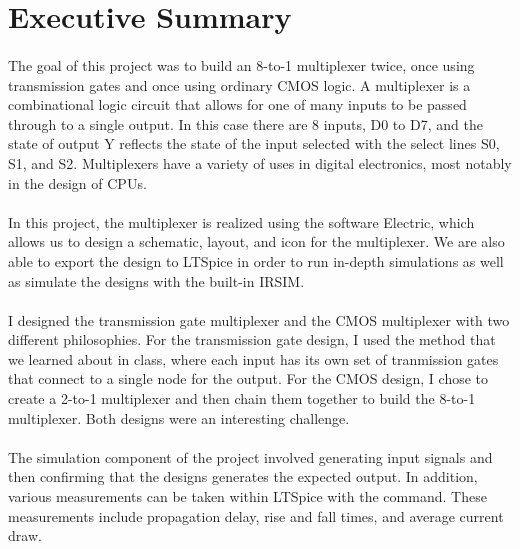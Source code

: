 \documentclass{article}
\begin{document}



\tableofcontents

\newpage
{}

\section{Executive Summary}
  \paragraph{}
  The goal of this project was to build an 8-to-1 multiplexer twice, once using transmission gates and once using ordinary CMOS logic. A multiplexer is a combinational logic circuit that allows for one of many inputs to be passed through to a single output. In this case there are 8 inputs, D0 to D7, and the state of output Y reflects the state of the input selected with the select lines S0, S1, and S2. Multiplexers have a variety of uses in digital electronics, most notably in the design of CPUs.

  \paragraph{}
  In this project, the multiplexer is realized using the software Electric, which allows us to design a schematic, layout, and icon for the multiplexer. We are also able to export the design to LTSpice in order to run in-depth simulations as well as simulate the designs with the built-in IRSIM. 

  \paragraph{}
  I designed the transmission gate multiplexer and the CMOS multiplexer with two different philosophies. For the transmission gate design, I used the method that we learned about in class, where each input has its own set of tranmission gates that connect to a single node for the output. For the CMOS design, I chose to create a 2-to-1 multiplexer and then chain them together to build the 8-to-1 multiplexer. Both designs were an interesting challenge.

  \paragraph{}
  The simulation component of the project involved generating input signals and then confirming that the designs generates the expected output. In addition, various measurements can be taken within LTSpice with the  command. These measurements include propagation delay, rise and fall times, and average current draw.
\end{document}
